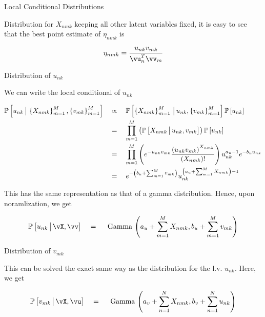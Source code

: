\documentclass{article}
\begin{document}
\begin{question}
\begin{qsection}{Local Conditional Distributions}
\begin{qsubsection}{Distribution for $X_{nmk}$}
		keeping all other latent variables fixed, it is easy to see that the best point estimate of $\eta_{nmk}$ is 
		
		\begin{equation}
			\eta_{nmk} = \frac{u_{nk} v_{mk}}{\vu_n^T \vv_m}
			\label{eq:eta}
		\end{equation}
			
		\end{qsubsection}

		\begin{qsubsection}{Distribution of $u_{nk}$}

			We can write the local conditional of $u_{nk}$ \br%


			\begin{align*}
				\prob{u_{nk} \pipe \set{X_{nmk}}_{m = 1}^M, \set{v_{mk}}_{m = 1}^M}	&\qprop	\prob{\set{X_{nmk}}_{m = 1}^{M} \pipe u_{nk}, \set{v_{mk}}_{m = 1}^M} \prob{u_{nk}} \\
																					&\eq	\prod_{m = 1}^{M} \para{\prob{X_{nmk} \pipe u_{nk}, v_{mk}}} \prob{u_{nk}} \\
																					&\eq	\prod_{m = 1}^{M} \para{\exp{-u_{nk} v_{mk}} \frac{\para{u_{nk} v_{mk}}^{X_{nmk}}}{\fact{X_{nmk}}}} u_{nk}^{a_u - 1} \exp{- b_u u_{nk}} \\
																					&\eq	\exp{-\para{b_u + \sum_{m = 1}^{M} v_{mk}}} u_{nk}^{\para{a_u + \sum_{m = 1}^{M} X_{nmk}} - 1}
			\end{align*}

			This has the same representation as that of a gamma distribution. Hence, upon noramlization, we get
		
			\begin{equation}
				\prob{u_{nk} \pipe \vX, \vv}	\eq	\func{\mt{Gamma}}{a_u + \sum_{m = 1}^{M} X_{nmk}, b_u + \sum_{m = 1}^{M} v_{mk}}
				\label{eq:unkpo}
			\end{equation}
		
		\end{qsubsection}

		\begin{qsubsection}{Distribution of $v_{mk}$}

			This can be solved the exact same way as the distribution for the l.v. $u_{nk}$. Here, we get

			\begin{equation}
				\prob{v_{mk} \pipe \vX, \vu}	\eq	\func{\mt{Gamma}}{a_v + \sum_{n = 1}^{N} X_{nmk}, b_v + \sum_{n = 1}^{N} u_{nk}}
				\label{eq:vnkpo}
			\end{equation}


\end{qsubsection}
\end{qsection}
\end{question}
\end{document}

